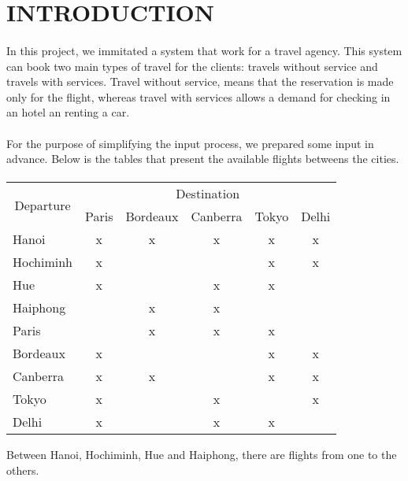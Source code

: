 \section{INTRODUCTION}

\paragraph{}
In this project, we immitated a system that work for a travel agency. This system can book two main types of travel for the clients: travels without service and travels with services. Travel without service, means that the reservation is made only for the flight, whereas travel with services allows a demand for checking in an hotel an renting a car.

\paragraph{}
For the purpose of simplifying the input process, we prepared some input in advance. Below is the tables that present the available flights betweens the cities.

\paragraph{}
\begin{table}[h]
\centering
\begin{tabular}{|l|c|c|c|c|c|}
\hline
\multicolumn{1}{|c|}{\multirow{2}{*}{Departure}} & \multicolumn{5}{c|}{Destination} \\ \cline{2-6} 
\multicolumn{1}{|c|}{} & \multicolumn{1}{l|}{Paris} & \multicolumn{1}{l|}{Bordeaux} & \multicolumn{1}{l|}{Canberra} & \multicolumn{1}{l|}{Tokyo} & \multicolumn{1}{l|}{Delhi} \\ \hline
Hanoi & x & x & x & x & x \\ \hline
Hochiminh & x &  &  & x & x \\ \hline
Hue & x &  & x & x &  \\ \hline
Haiphong &  & x & x &  &  \\ \hline
Paris &  & x & x & x &  \\ \hline
Bordeaux & x &  &  & x & x \\ \hline
Canberra & x & x &  & x & x \\ \hline
Tokyo & x &  & x &  & x \\ \hline
Delhi & x &  & x & x &  \\ \hline
\end{tabular}
\end{table}

Between Hanoi, Hochiminh, Hue and Haiphong, there are flights from one to the others. 
